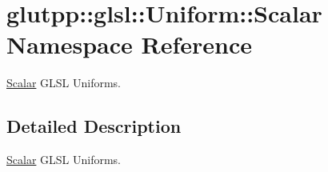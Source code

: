 \hypertarget{namespaceglutpp_1_1glsl_1_1Uniform_1_1Scalar}{\section{glutpp\-:\-:glsl\-:\-:\-Uniform\-:\-:\-Scalar \-Namespace \-Reference}
\label{namespaceglutpp_1_1glsl_1_1Uniform_1_1Scalar}
}


\hyperlink{namespaceglutpp_1_1glsl_1_1Uniform_1_1Scalar}{\-Scalar} \-G\-L\-S\-L \-Uniforms.  




\subsection{\-Detailed \-Description}
\hyperlink{namespaceglutpp_1_1glsl_1_1Uniform_1_1Scalar}{\-Scalar} \-G\-L\-S\-L \-Uniforms. 